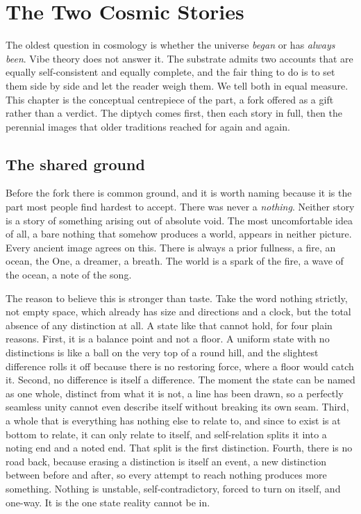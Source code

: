 \section{The Two Cosmic Stories}
\label{app:cosmic-stories}

The oldest question in cosmology is whether the universe \emph{began} or has \emph{always been}. Vibe theory does
not answer it. The substrate admits two accounts that are equally self-consistent and equally complete, and the
fair thing to do is to set them side by side and let the reader weigh them. We tell both in equal measure. This
chapter is the conceptual centrepiece of the part, a fork offered as a gift rather than a verdict. The diptych
comes first, then each story in full, then the perennial images that older traditions reached for again and again.

\subsection{The shared ground}

Before the fork there is common ground, and it is worth naming because it is the part most people find hardest to
accept. There was never a \emph{nothing}. Neither story is a story of something arising out of absolute void. The
most uncomfortable idea of all, a bare nothing that somehow produces a world, appears in neither picture. Every
ancient image agrees on this. There is always a prior fullness, a fire, an ocean, the One, a dreamer, a breath.
The world is a spark of the fire, a wave of the ocean, a note of the song.

The reason to believe this is stronger than taste. Take the word nothing strictly, not empty space, which already
has size and directions and a clock, but the total absence of any distinction at all. A state like that cannot
hold, for four plain reasons. First, it is a balance point and not a floor. A uniform state with no distinctions
is like a ball on the very top of a round hill, and the slightest difference rolls it off because there is no
restoring force, where a floor would catch it. Second, no difference is itself a difference. The moment the state
can be named as one whole, distinct from what it is not, a line has been drawn, so a perfectly seamless unity
cannot even describe itself without breaking its own seam. Third, a whole that is everything has nothing else to
relate to, and since to exist is at bottom to relate, it can only relate to itself, and self-relation splits it
into a noting end and a noted end. That split is the first distinction. Fourth, there is no road back, because
erasing a distinction is itself an event, a new distinction between before and after, so every attempt to reach
nothing produces more something. Nothing is unstable, self-contradictory, forced to turn on itself, and one-way.
It is the one state reality cannot be in.

